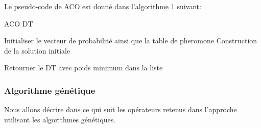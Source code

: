 \begin{enumerate}
Le pseudo-code de ACO est donné dans l’algorithme 1 suivant:\\

\begin{algorithm}[H]
\caption{ACO DT}
\SetAlgoLined
\DontPrintSemicolon
\large
\large

Initialiser le vecteur de probabilité ainsi que la table de pheromone \;
Construction de la solution initiale \;

Retourner le DT avec poids minimum dans la liste \;
\end{algorithm}
	
\end{enumerate}



\subsubsection{Algorithme génétique}
Nous allons décrire dans ce qui suit les opérateurs retenus dans l'approche utilisant les algorithmes génétiques. 


